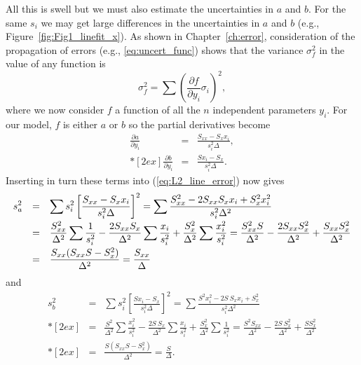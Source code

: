    All this is swell but we must also estimate the uncertainties in $a$ and $b$.  For the same $s_i$ we 
may get large differences in the uncertainties in $a$ and $b$ (e.g., Figure~\ref{fig:Fig1_linefit_x}).
As shown in Chapter~\ref{ch:error}, consideration of the propagation of errors (e.g., \ref{eq:uncert_func}) shows
that the variance $\sigma_f^2$ in the value of any function is
\begin{equation}
\sigma^2_f = \sum \left ( \frac{\partial f}{\partial y_i} \sigma_i \right )^2,
\label{eq:L2_line_error}
\end{equation}
where we now consider $f$ a function of all the $n$ independent parameters $y_i$. For our model,
$f$ is either $a$ or $b$ so the partial derivatives become
\begin{equation}
\begin{array}{rcl}
\displaystyle \frac{\partial a}{\partial y_i} & = & \displaystyle \frac{S_{xx} - S_x x_i}{s ^2_i \Delta},\\*[2ex]
\displaystyle \frac{\partial b}{\partial y_i} & = & \displaystyle \frac{Sx_{i} - S_x}{s ^2_i \Delta}.
\end{array}
\end{equation}
Inserting in turn these terms into (\ref{eq:L2_line_error}) now gives
\begin{equation}
\begin{array}{rcl} 
\displaystyle
\displaystyle s^2_a & = & \displaystyle \sum s^2_i \left [ \frac{S_{xx} - S_{x} x_i}{s ^2_i \Delta} \right ] ^2 = \sum \frac{S^2_{xx} - 2S_{xx}S_{x}x_i + S^2_x x^2_i}{s^2_i \Delta ^2}\\*[2ex]
& = & \displaystyle \frac{S^2_{xx}}{\Delta^2} \sum \frac{1}{s^2_i} - \frac{2S_{xx}S_x}{\Delta^2}
\sum \frac{x_i}{s^2_i} + \frac{S^2_x}{\Delta^2} \sum \frac{x^2_i}{s^2_i}= \frac{S^2_{xx}S}{\Delta^2} - \frac{2S_{xx}S^2_x}{\Delta ^2} + \frac{S_{xx}S^2_x}{\Delta^2} \\*[2ex]
& = & \displaystyle \frac{S_{xx} (S_{xx}S-S^2_x)}{\Delta^2} = \frac{S_{xx}}{\Delta}
\end{array}
\end{equation}
and	
\begin{equation}
\begin{array}{rcl}
\displaystyle s^2_b & = & \displaystyle \sum s^2_i \left [ \frac{Sx_i - S_x}{s^2_i \Delta} \right ] ^2 =
\sum \frac{S^2x^2_i - 2S \ S_x x_i + S^2_x}{s^2_i \Delta^2}\\*[2ex]
 &  = & \displaystyle \frac{S^2}{\Delta^2}\sum \frac{x^2_i}{s^2_i} - 
\frac{2S \ S_x}{\Delta^2} \sum \frac{x_i}{s^2_i} + \frac{S^2_x}{\Delta^2} \sum \frac{1}{s^2_i} = \frac{S^2S_{xx}}{\Delta^2} - \frac{2S \ S^2_x}{\Delta^2} + \frac{S S^2_x}{\Delta ^2}\\*[2ex]
& = & \displaystyle \frac{S(S_{xx}S - S^2_x)}{\Delta^2} = \frac{S}{\Delta}.
\label{eq:err_in_slope}
\end{array}
\end{equation}
